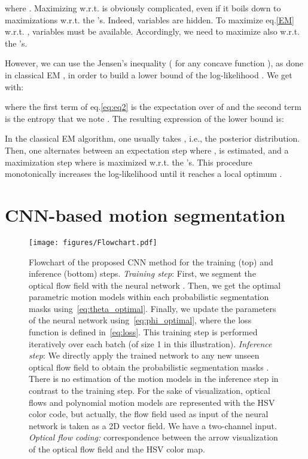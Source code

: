 \documentclass[10pt,twocolumn,letterpaper]{article}
\begin{document}
 where . Maximizing  w.r.t.  is obviously complicated, even if it boils down to  maximizations w.r.t. the 's. Indeed, variables  are hidden. To maximize eq.\eqref{EM} w.r.t. , variables  must be available. Accordingly, we need to maximize also w.r.t. the 's.


However, we can use the Jensen's inequality ( for any concave function ), as done in classical EM \cite{murphy_book2012}, in order to build a lower bound  of the log-likelihood . We get  with:

where the first term of eq.\eqref{eq:eq2} is the expectation over  of  and the second term is the entropy that we note . The resulting expression of the lower bound is: 

In the classical EM algorithm, one usually takes , i.e., the posterior distribution. Then, one alternates between an expectation step where , is estimated, and a maximization step where  is maximized w.r.t. the 's. This procedure monotonically increases the log-likelihood until it reaches a local optimum \cite{murphy_book2012}. 



\section{CNN-based motion segmentation}
\label{CNN}

\begin{figure*}[tbh!]
\centering
\texttt{[image: figures/Flowchart.pdf]}
\caption{Flowchart of the proposed CNN method for the training (top) and inference (bottom) steps. \textit{Training step}: First, we segment the optical flow field  with the neural network . Then, we get the optimal parametric motion models  within each probabilistic segmentation masks  using~\eqref{eq:theta_optimal}. Finally, we update the parameters  of the neural network using~\eqref{eq:phi_optimal}, where the loss function is defined in~\eqref{eq:loss}. This training step is performed iteratively over each batch  (of size 1 in this illustration). \textit{Inference step}: We directly apply the trained network  to any new unseen optical flow field  to obtain the probabilistic segmentation masks . There is no estimation of the motion models  in the inference step in contrast to the training step. For the sake of visualization, optical flows and polynomial motion models are represented with the HSV color code, but actually, the flow field  used as input of the neural network is taken as a 2D vector field. We have a two-channel input. {\color{black} \textit{Optical flow coding:} correspondence between the arrow visualization of the optical flow field and the HSV color map.}}
\label{fig:flowchart}
 \vspace{-0.3cm}
\end{figure*}
\end{document}
